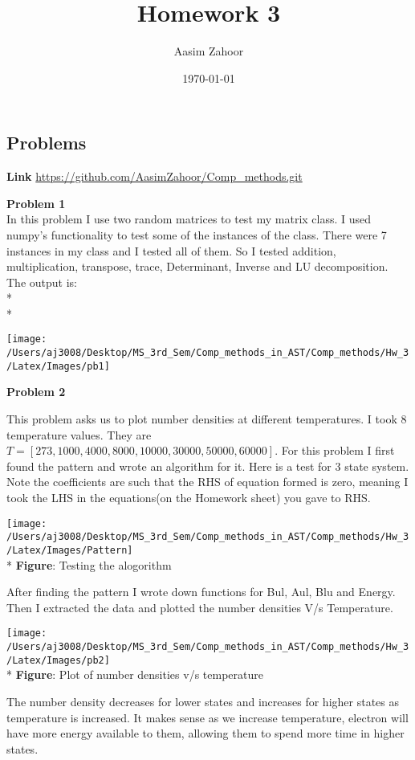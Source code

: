 \documentclass{article}
\title{Homework 3}
\author{Aasim Zahoor}
\date\today
\begin{document}
\maketitle 


\begin{center}
\section{Problems}
\end{center}
\textbf{Link}\vspace{1.5em}
\url{https://github.com/AasimZahoor/Comp_methods.git}
\vspace{1.5em}

\textbf{Problem 1}\vspace{1.5em}
\\
In this problem I use two random matrices to test my matrix class. I used numpy's functionality to test some of the instances of the class. There were 7 instances in my class and I tested all of them. So I tested addition, multiplication, transpose, trace, Determinant, Inverse and LU decomposition. The output is:
\\*
\\*
\begin{center}
\texttt{[image: /Users/aj3008/Desktop/MS\_3rd\_Sem/Comp\_methods\_in\_AST/Comp\_methods/Hw\_3/Latex/Images/pb1]}
\end{center}

\clearpage





\textbf{Problem 2}\vspace{1.5em}

This problem asks us to plot number densities at different temperatures. I took 8 temperature values. They are $T=[273,1000,4000,8000,10000,30000,50000,60000]$. For this problem I first found the pattern and wrote an algorithm for it. Here is a test for 3 state system. Note the coefficients are such that the RHS of equation formed is zero, meaning I took the LHS in the equations(on the Homework sheet) you gave to RHS.

\begin{center}
\texttt{[image: /Users/aj3008/Desktop/MS\_3rd\_Sem/Comp\_methods\_in\_AST/Comp\_methods/Hw\_3/Latex/Images/Pattern]}
\\*
\textbf{Figure}: Testing the alogorithm
\end{center}

After finding the pattern I wrote down functions for Bul, Aul, Blu and Energy. Then I extracted the data and plotted the number densities V/s Temperature.
\begin{center}
\texttt{[image: /Users/aj3008/Desktop/MS\_3rd\_Sem/Comp\_methods\_in\_AST/Comp\_methods/Hw\_3/Latex/Images/pb2]}
\\*
\textbf{Figure}: Plot of number densities v/s temperature
\end{center} 
The number density decreases for lower states and increases for higher states as temperature is increased. It makes sense as we increase temperature, electron will have more energy available to them, allowing them to spend more time in higher states.
\end{document}
